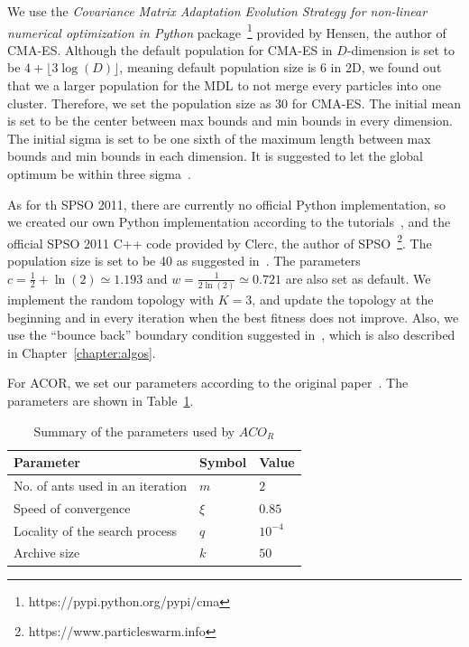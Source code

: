 We use the \textit{Covariance Matrix Adaptation Evolution Strategy for non-linear numerical optimization in Python} package~\footnote{https://pypi.python.org/pypi/cma} provided by Hensen, the author of CMA-ES.
Although the default population for CMA-ES in $D$-dimension is set to be $4 + \lfloor3\log(D)\rfloor$, meaning default population size is 6 in 2D,
we found out that we a larger population for the MDL to not merge every particles into one cluster.
Therefore, we set the population size as 30 for CMA-ES.
The initial mean is set to be the center between max bounds and min bounds in every dimension.
The initial sigma is set to be one sixth of the maximum length between max bounds and min bounds in each dimension. 
It is suggested to let the global optimum be within three sigma~\cite{Hansen:2006:CMA_ES_review}.

As for th SPSO 2011, there are currently no official Python implementation, 
so we created our own Python implementation according to the tutorials~\cite{Clerc:2012:SPSO2011},
and the official SPSO 2011 C++ code provided by Clerc, the author of SPSO~\footnote{https://www.particleswarm.info}.
The population size is set to be 40 as suggested in~\cite{Clerc:2012:SPSO2011}.
The parameters $c = \frac{1}{2} + \ln(2) \simeq 1.193$ and $w = \frac{1}{2\ln(2)} \simeq 0.721$ are also set as default.
We implement the random topology with $K = 3$,
and update the topology at the beginning and in every iteration when the best fitness does not improve.
Also, we use the ``bounce back'' boundary condition suggested in~\cite{Clerc:2012:SPSO2011}, which is also described in Chapter~\ref{chapter:algos}.

For ACOR, we set our parameters according to the original paper~\cite{Socha:2008:ACOR}. 
The parameters are shown in Table~\ref{table:ACOR_parameters}.

\begin{table}%
\centering
\label{table:ACOR_parameters}
\begin{tabular}{lll}
\hline
Parameter                        & Symbol   & Value          \\ \hline
No. of ants used in an iteration & $m$      & $2$            \\
Speed of convergence             & $\xi$    & $0.85$         \\
Locality of the search process   & $q$      & $10^{-4}$      \\
Archive size                     & $k$      & $50$           \\ \hline
\end{tabular}
\caption{Summary of the parameters used by $ACO_R$}
\end{table}

